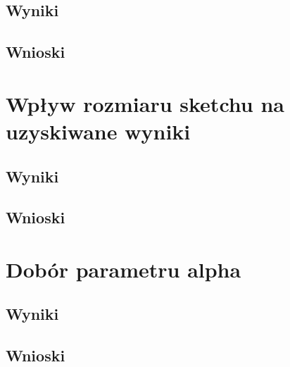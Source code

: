     \subsection{Wyniki}

    \subsection{Wnioski}

\section{Wpływ rozmiaru sketchu na uzyskiwane wyniki}

    \subsection{Wyniki}

    \subsection{Wnioski}

\section{Dobór parametru alpha}

    \subsection{Wyniki}

    \subsection{Wnioski}